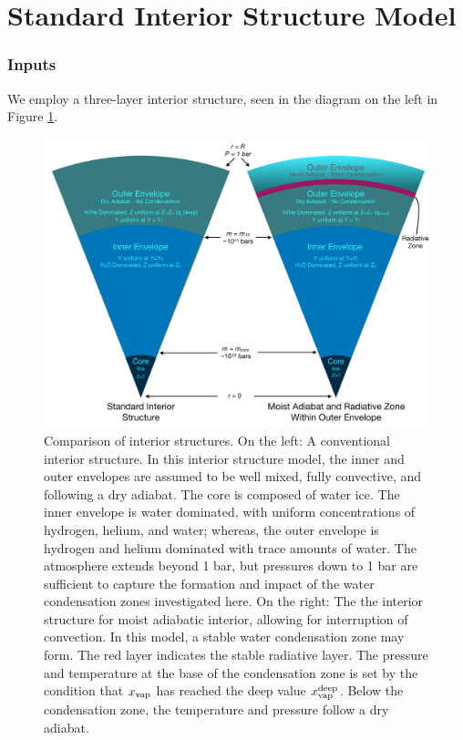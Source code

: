 \documentclass[11pt]{ucscthesisbs}
\begin{document}
\section{Standard Interior Structure Model}
\subsubsection{Inputs}
We employ a three-layer interior structure, seen in the diagram on the left in Figure \ref{fig:standard_dry_interior}. 
\begin{figure}[ht!]
 \centerline{
  \includegraphics[width=\columnwidth]{figures/onion.pdf}
 }
\caption[A Standard Interior Structure Model]
{Comparison of interior structures. On the left: A conventional interior structure. In this interior structure model, the inner and outer envelopes are assumed to be well mixed, fully convective, and following a dry adiabat. The core is composed of water ice. The inner envelope is water dominated, with uniform concentrations of hydrogen, helium, and water; whereas, the outer envelope is hydrogen and helium dominated with trace amounts of water. The atmosphere extends beyond 1 bar, but pressures down to 1 bar are sufficient to capture the formation and impact of the water condensation zones investigated here. On the right: The the interior structure for moist adiabatic interior, allowing for interruption of convection. In this model, a stable water condensation zone may form. The red layer indicates the stable radiative layer. The pressure and temperature at the base of the condensation zone is set by the condition that $x_{\rm vap}$ has reached the deep value $x_{\rm vap}^{\rm deep}$. Below the condensation zone, the temperature and pressure follow a dry adiabat.}
\label{fig:standard_dry_interior}
\end{figure}
\end{document}
